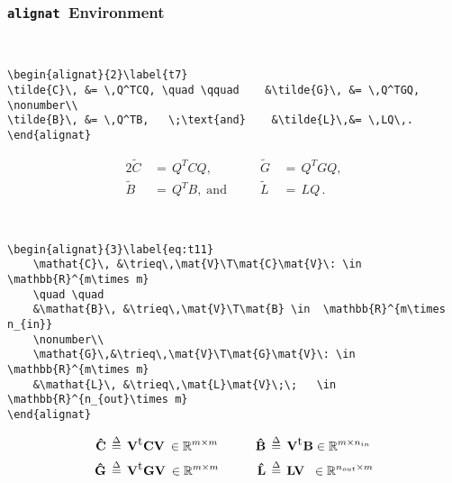 \subsubsection{\texttt{\Large alignat}~Environment}
%
\raggedright{}\\
%
\begin{verbatim}
\begin{alignat}{2}\label{t7}
\tilde{C}\, &= \,Q^TCQ, \quad \qquad    &\tilde{G}\, &= \,Q^TGQ, \nonumber\\ 
\tilde{B}\, &= \,Q^TB,   \;\text{and}    &\tilde{L}\,&= \,LQ\,. 
\end{alignat}
\end{verbatim}
%
%
\begin{alignat}{2}\label{t7}
\tilde{C}\, &= \,Q^TCQ, \quad \qquad    &\tilde{G}\, &= \,Q^TGQ, \nonumber\\ 
\tilde{B}\, &= \,Q^TB,   \;\text{and}    &\tilde{L}\,&= \,LQ\,. 
\end{alignat}
%
%
\raggedright{}\\
%
\begin{verbatim}
\begin{alignat}{3}\label{eq:t11}
	\mathat{C}\, &\trieq\,\mat{V}\T\mat{C}\mat{V}\: \in \mathbb{R}^{m\times m} 
	\quad \quad    
	&\mathat{B}\, &\trieq\,\mat{V}\T\mat{B} \in  \mathbb{R}^{m\times n_{in}} 
	\nonumber\\ 
	\mathat{G}\,&\trieq\,\mat{V}\T\mat{G}\mat{V}\: \in \mathbb{R}^{m\times m} 
	&\mathat{L}\, &\trieq\,\mat{L}\mat{V}\;\;   \in \mathbb{R}^{n_{out}\times m}
\end{alignat}
\end{verbatim}
%
%
\begin{alignat}{3}\label{eq:t11}
	\mathat{C}\, &\trieq\,\mat{V}\T\mat{C}\mat{V}\: \in \mathbb{R}^{m\times m} 
	\quad \quad    
	&\mathat{B}\, &\trieq\,\mat{V}\T\mat{B} \in  \mathbb{R}^{m\times n_{in}}    \nonumber\\ 
	\mathat{G}\,&\trieq\,\mat{V}\T\mat{G}\mat{V}\: \in \mathbb{R}^{m\times m} 
	&\mathat{L}\, &\trieq\,\mat{L}\mat{V}\;\;   \in \mathbb{R}^{n_{out}\times m}
\end{alignat}
%
%
